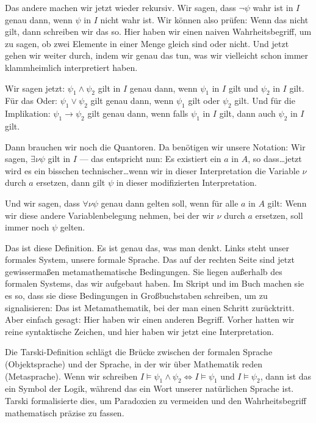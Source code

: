 \begin{spoken-clean}[01:09:17 - 01:11:47]
Das andere machen wir jetzt wieder rekursiv. Wir sagen, dass $\neg \psi$ wahr ist in $I$ genau dann, wenn $\psi$ in $I$ nicht wahr ist. Wir können also prüfen: Wenn das nicht gilt, dann schreiben wir das so. Hier haben wir einen naiven Wahrheitsbegriff, um zu sagen, ob zwei Elemente in einer Menge gleich sind oder nicht. Und jetzt gehen wir weiter durch, indem wir genau das tun, was wir vielleicht schon immer klammheimlich interpretiert haben.

Wir sagen jetzt: $\psi_1 \land \psi_2$ gilt in $I$ genau dann, wenn $\psi_1$ in $I$ gilt und $\psi_2$ in $I$ gilt. Für das Oder: $\psi_1 \lor \psi_2$ gilt genau dann, wenn $\psi_1$ gilt oder $\psi_2$ gilt. Und für die Implikation: $\psi_1 \to \psi_2$ gilt genau dann, wenn falls $\psi_1$ in $I$ gilt, dann auch $\psi_2$ in $I$ gilt.
\end{spoken-clean}

\begin{spoken-clean}[01:11:47 - 01:15:07]
Dann brauchen wir noch die Quantoren. Da benötigen wir unsere Notation: Wir sagen, $\exists \nu \psi$ gilt in $I$ --- das entspricht nun: Es existiert ein $a$ in $A$, so dass\dots jetzt wird es ein bisschen technischer\dots wenn wir in dieser Interpretation die Variable $\nu$ durch $a$ ersetzen, dann gilt $\psi$ in dieser modifizierten Interpretation.

Und wir sagen, dass $\forall \nu \psi$ genau dann gelten soll, wenn für alle $a$ in $A$ gilt: Wenn wir diese andere Variablenbelegung nehmen, bei der wir $\nu$ durch $a$ ersetzen, soll immer noch $\psi$ gelten.

Das ist diese Definition. Es ist genau das, was man denkt. Links steht unser formales System, unsere formale Sprache. Das auf der rechten Seite sind jetzt gewissermaßen metamathematische Bedingungen. Sie liegen außerhalb des formalen Systems, das wir aufgebaut haben. Im Skript und im Buch machen sie es so, dass sie diese Bedingungen in Großbuchstaben schreiben, um zu signalisieren: Das ist Metamathematik, bei der man einen Schritt zurücktritt. Aber einfach gesagt: Hier haben wir einen anderen Begriff. Vorher hatten wir reine syntaktische Zeichen, und hier haben wir jetzt eine Interpretation.
\end{spoken-clean}

\begin{didactic-insight}
Die Tarski-Definition schlägt die Brücke zwischen der formalen Sprache (Objektsprache) und der Sprache, in der wir über Mathematik reden (Metasprache). Wenn wir schreiben $I \models \psi_1 \land \psi_2 \iff I \models \psi_1 \text{ und } I \models \psi_2$, dann ist das \qt{$\land$} ein Symbol der Logik, während das  ein Wort unserer natürlichen Sprache ist. Tarski formalisierte dies, um Paradoxien zu vermeiden und den Wahrheitsbegriff mathematisch präzise zu fassen.
\end{didactic-insight}

